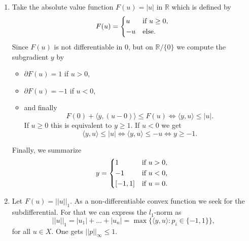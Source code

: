     \begin{example}
    \label{ex:subgradient_subdifferential}

        \begin{enumerate}
            \item Take the absolute value function $F(u) = |u|$ in $\mathbb{R}$ which is defined by
                $$
                    F(u) =
                        \begin{dcases*}
                            u & \textnormal{if $u \ge 0$,} \\
                            -u & \textnormal{else}.
                        \end{dcases*}
                $$
            Since $F(u)$ is not differentiable in $0$, but on $\mathbb{R} / \{0\}$ we compute the subgradient $y$ by
                \begin{itemize}
                    \item $\partial F(u) = 1$ if $u > 0$,
                    \item $\partial F(u) = -1$ if $u < 0$,
                    \item and finally
                        $$
                            F(0) + \langle y, (u - 0) \rangle \le F(u) \Longleftrightarrow \langle y, u \rangle \le |u|.
                        $$
                    If $u \ge 0$ this is equivalent to $y \ge 1$. If $u < 0$ we get
                        $$
                            \langle y, u \rangle \le |u| \Longleftrightarrow \langle y, u \rangle \le -u \Longleftrightarrow y \ge -1.
                        $$
                \end{itemize}
            Finally, we summarize
                $$
                    y =
                        \begin{dcases*}
                            1 & \textnormal{if $u > 0$,} \\
                            -1 & \textnormal{if $u < 0$,} \\
                            [-1, 1] & \textnormal{if $u = 0$.}
                        \end{dcases*}
                $$
            \item Let $F(u) = ||u||_{1}$. As a non-differentiable convex function we seek for the subdifferential. For that we can express the $l_{1}$-norm as 
                $$
                    ||u||_{1} = |u_{1}| + ... + |u_{n}| = \max \big\{ \langle y, u \rangle : p_{i} \in \{-1, 1\} \big\},
                $$
             for all $u \in X$. One gets $||p||_{\infty} \le 1$. %

\end{enumerate}
\end{example}
